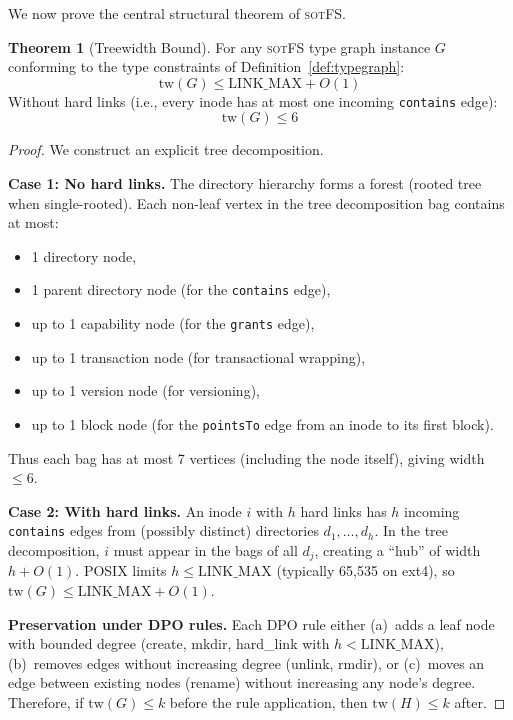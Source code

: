\documentclass[11pt,a4paper]{article}
\theoremstyle{definition}
\newtheorem{theorem}{Theorem}[section]
\theoremstyle{remark}
\newcommand{\sotfs}{\textsc{sotFS}}
\newcommand{\tw}{\ensuremath{\mathrm{tw}}}
\begin{document}
We now prove the central structural theorem of \sotfs{}.

\begin{theorem}[Treewidth Bound]
\label{thm:treewidth}
For any \sotfs{} type graph instance $G$ conforming to the type
constraints of Definition~\ref{def:typegraph}:
\[
\tw(G) \leq \mathrm{LINK\_MAX} + O(1)
\]
Without hard links (i.e., every inode has at most one incoming
\texttt{contains} edge):
\[
\tw(G) \leq 6
\]
\end{theorem}

\begin{proof}
We construct an explicit tree decomposition.

\textbf{Case 1: No hard links.} The directory hierarchy forms a
forest (rooted tree when single-rooted). Each non-leaf vertex in the
tree decomposition bag contains at most:
\begin{itemize}[leftmargin=1.4em]
\item 1 directory node,
\item 1 parent directory node (for the \texttt{contains} edge),
\item up to 1 capability node (for the \texttt{grants} edge),
\item up to 1 transaction node (for transactional wrapping),
\item up to 1 version node (for versioning),
\item up to 1 block node (for the \texttt{pointsTo} edge from an
  inode to its first block).
\end{itemize}
Thus each bag has at most 7 vertices (including the node itself),
giving width $\leq 6$.

\textbf{Case 2: With hard links.} An inode $i$ with $h$ hard links
has $h$ incoming \texttt{contains} edges from (possibly distinct)
directories $d_1, \ldots, d_h$. In the tree decomposition, $i$ must
appear in the bags of all $d_j$, creating a ``hub'' of width $h + O(1)$.
POSIX limits $h \leq \mathrm{LINK\_MAX}$ (typically 65{,}535 on ext4),
so $\tw(G) \leq \mathrm{LINK\_MAX} + O(1)$.

\textbf{Preservation under DPO rules.} Each DPO rule either
(a)~adds a leaf node with bounded degree (create, mkdir, hard\_link
with $h < \mathrm{LINK\_MAX}$), (b)~removes edges without increasing
degree (unlink, rmdir), or (c)~moves an edge between existing nodes
(rename) without increasing any node's degree. Therefore, if
$\tw(G) \leq k$ before the rule application, then $\tw(H) \leq k$
after.
\end{proof}
\end{document}
